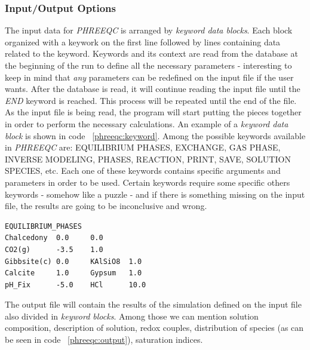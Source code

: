 \documentclass[ppgc,mestrado,english]{iiufrgs}
\begin{document}
\subsubsection{Input/Output Options}
The input data for \emph{PHREEQC} is arranged by \emph{keyword data blocks}. Each block organized with a keywork on the first line followed by lines containing data related to the keyword. Keywords and its context are read from the database at the beginning of the run to define all the necessary parameters - interesting to keep in mind that \emph{any} parameters can be redefined on the input file if the user wants. After the database is read, it will continue reading the input file until the \emph{END} keyword is reached. This process will be repeated until the end of the file. As the input file is being read, the program will start putting the pieces together in order to perform the necessary calculations. An example of a \emph{keyword data block} is shown in code ~\ref{phreeqc:keyword}. Among the possible keywords available in \emph{PHREEQC} are: EQUILIBRIUM PHASES, EXCHANGE, GAS PHASE, INVERSE MODELING, PHASES, REACTION, PRINT, SAVE, SOLUTION SPECIES, etc. Each one of these keywords contains specific arguments and parameters in order to be used. Certain keywords require some specific others keywords - somehow like a puzzle - and if there is something missing on the input file, the results are going to be inconclusive and wrong.

\begin{lstlisting}[frame=single, caption=\emph{PHREEQC} keyword data block example, label=phreeqc:keyword]
EQUILIBRIUM_PHASES
Chalcedony  0.0     0.0
CO2(g)      -3.5    1.0
Gibbsite(c) 0.0     KAlSiO8  1.0
Calcite     1.0     Gypsum   1.0
pH_Fix      -5.0    HCl      10.0
\end{lstlisting}


The output file will contain the results of the simulation defined on the input file also divided in \emph{keyword blocks}. Among those we can mention solution composition, description of solution, redox couples, distribution of species (as can be seen in code ~\ref{phreeqc:output}), saturation indices.
\end{document}
